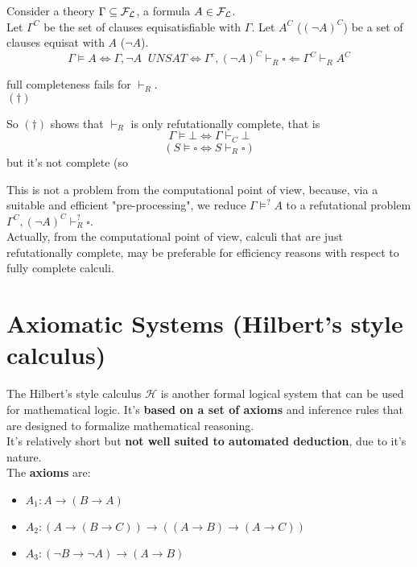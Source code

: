 Consider a theory $\Gamma \subseteq \mathcal{F}_\mathcal{L}$, a formula $A \in \mathcal{F}_\mathcal{L}$.\\
Let $\Gamma^C$ be the set of clauses equisatisfiable with $\Gamma$. Let $A^C$ ($(\neg A)^C$) be a set of clauses equisat with $A$ ($\neg A$).\\

$$ \Gamma \models A \Leftrightarrow \Gamma, \neg A \;\; UNSAT \Leftrightarrow \Gamma^c, (\neg A)^C \vdash_R \square \Leftarrow \Gamma^C \vdash_R A^C$$

full completeness fails for $\vdash_R$.\\


$(\dag)$

So $(\dag)$ shows that $\vdash_R$ is only refutationally complete, that is 
$$ \Gamma \models \bot \Leftrightarrow \Gamma \vdash_C \bot $$
$$ (S \models \square \Leftrightarrow S \vdash_R \square) $$
but it's not complete (so $ $%

This is not a problem from the computational point of view, because, via a suitable and efficient "pre-processing", we reduce $\Gamma \models^? A$ to a refutational problem $\Gamma^C, (\neg A)^C \vdash_R^? \square$.\\

Actually, from the computational point of view, calculi that are just refutationally complete, may be preferable for efficiency reasons with respect to fully complete calculi.\\


\newpage

\section{Axiomatic Systems (Hilbert's style calculus)}

The Hilbert's style calculus $\mathcal{H}$ is another formal logical system that can be used for mathematical logic. It's \textbf{based on a set of axioms} and inference rules that are designed to formalize mathematical reasoning. \\

It's relatively short but \textbf{not well suited to automated deduction}, due to it's nature.\\

The \textbf{axioms} are: 
\begin{itemize}
	\item $A_1: A \rightarrow ( B\rightarrow A)$
	\item $A_2: (A \rightarrow (B \rightarrow C)) \rightarrow ((A \rightarrow B) \rightarrow (A \rightarrow C))$
	\item $A_3: (\neg B \rightarrow \neg A) \rightarrow (A \rightarrow B)$
\end{itemize}

